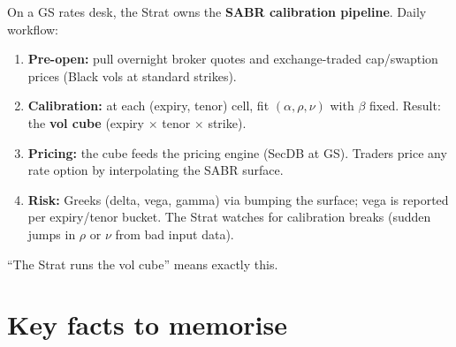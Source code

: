 \begin{gsbox}
On a GS rates desk, the Strat owns the \textbf{SABR calibration
pipeline}.  Daily workflow:
\begin{enumerate}
  \item \textbf{Pre-open:} pull overnight broker quotes and
    exchange-traded cap/swaption prices (Black vols at standard
    strikes).
  \item \textbf{Calibration:} at each (expiry, tenor) cell, fit
    $(\alpha, \rho, \nu)$ with $\beta$ fixed.  Result: the
    \textbf{vol cube} (expiry $\times$ tenor $\times$ strike).
  \item \textbf{Pricing:} the cube feeds the pricing engine (SecDB at
    GS).  Traders price any rate option by interpolating the SABR
    surface.
  \item \textbf{Risk:} Greeks (delta, vega, gamma) via bumping the
    surface; vega is reported per expiry/tenor bucket.  The Strat
    watches for calibration breaks (sudden jumps in $\rho$ or $\nu$
    from bad input data).
\end{enumerate}
``The Strat runs the vol cube'' means exactly this.
\end{gsbox}


\section*{Key facts to memorise}
\label{sec:rates_deriv_keyfacts}

